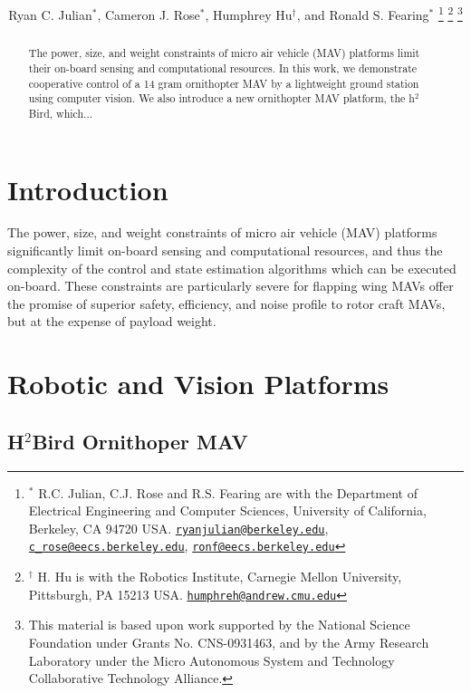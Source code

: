\documentclass[letterpaper, 10 pt, conference]{ieeeconf}
\title{\LARGE \bf \papertitle}
\author{
    Ryan C. Julian$^{*}$,
    Cameron J. Rose$^{*}$,
    Humphrey Hu$^{\dagger}$, and
    Ronald S. Fearing$^{*}$
    \thanks{$^{*}$
    	R.C. Julian, C.J. Rose and R.S. Fearing are
        with the Department of Electrical Engineering and Computer Sciences,
        University of California, Berkeley, CA 94720 USA.
        \href{mailto:ryanjulian@berkeley.edu}{\tt ryanjulian@berkeley.edu},
        \href{mailto:c\_rose@eecs.berkeley.edu}{\tt c\_rose@eecs.berkeley.edu},
        \href{mailto:ronf@eecs.berkeley.edu}{\tt ronf@eecs.berkeley.edu}
    }
    \thanks{$^{\dagger}$
        H. Hu is with the Robotics Institute,
        Carnegie Mellon University, Pittsburgh, PA 15213 USA.
        \href{mailto:humphreh@andrew.cmu.edu}{\tt humphreh@andrew.cmu.edu}
    }
    \thanks{
        This material is based upon work supported by the National Science
        Foundation under Grants No. CNS-0931463, and by the Army Research
        Laboratory under the Micro Autonomous System and Technology
        Collaborative Technology Alliance.
    }
}
\begin{document}
\maketitle
\thispagestyle{empty}
\pagestyle{empty}

\begin{abstract}
The power, size, and weight constraints of micro air vehicle (MAV) platforms limit their on-board sensing and computational resources. In this work, we demonstrate cooperative control of a 14 gram ornithopter MAV by a lightweight ground station using computer vision. We also introduce a new ornithopter MAV platform, the h$^2$Bird, which...
\end{abstract}

\section{Introduction}
The power, size, and weight constraints of micro air vehicle (MAV) platforms significantly limit on-board sensing and computational resources, and thus the complexity of the control and state estimation algorithms which can be executed on-board. These constraints are particularly severe for flapping wing MAVs offer the promise of superior safety, efficiency, and noise profile to rotor craft MAVs, but at the expense of payload weight.

\section{Robotic and Vision Platforms}

\subsection{H$^2$Bird Ornithoper MAV}
\end{document}
